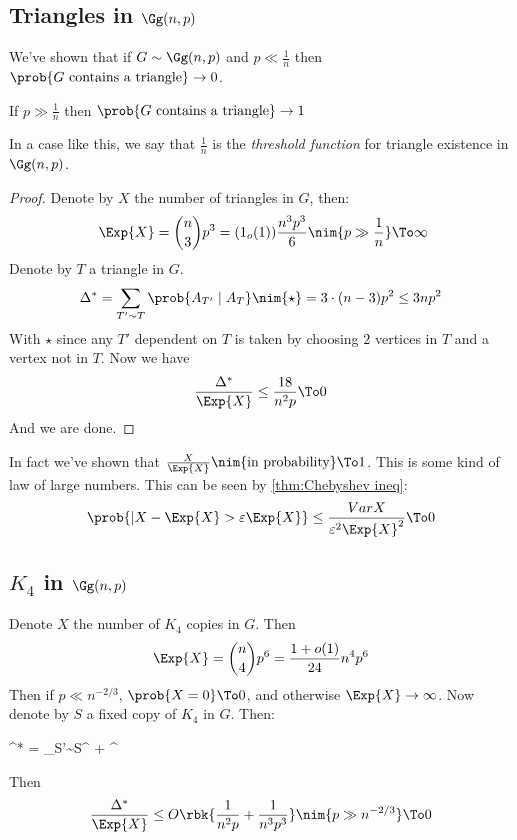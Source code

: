 \documentclass[a4paper, 11pt, oneside]{book}
\begin{document}
\subsection{Triangles in $\Gg(n,p)$}
We've shown that if $G\sim \Gg(n,p)$ and $p \ll \frac{1}{n}$ then $\prob{G\text{ contains a triangle}}\to 0$.
\begin{claim}
	If $p \gg \frac{1}{n}$ then $\prob{G\text{ contains a triangle}}\to 1$
\end{claim}
\begin{remark}
In a case like this, we say that $\frac{1}{n}$ is the \emph{threshold function} for triangle existence in $\Gg(n,p)$.
\end{remark}
\begin{proof}
	Denote by $X$ the number of triangles in $G$, then:
	\[
	\
	\Exp{X} = {n\choose 3}p^3 = (1_o(1))\frac{n^3p^3}{6}\nim{p\gg \frac{1}{n}}\To\infty
	\]
	Denote by $T$ a triangle in $G$.
	\[
	\Delta^* = \sum_{T'\sim T}\prob{A_{T'}\mid A_T} \nim{\star}= 3\cdot(n-3)p^2\le 3np^2
	\]
	With $\star$ since any $T'$ dependent on $T$ is taken by choosing $2$ vertices in $T$ and a vertex not in $T$. Now we have
	\[
	\frac{\Delta^*}{\Exp{X}} \le \frac{18}{n^2p}\To 0
	\]
	And we are done.
\end{proof}
\begin{remark}
In fact we've shown that $\frac{X}{\Exp{X}}\nim{\text{in probability}}\To 1$. This is some kind of law of large numbers. This can be seen by \autoref{thm:Chebyshev ineq}:
\[
\prob{|X-\Exp{X}> \varepsilon \Exp{X}}\le \frac{Var{X}}{\varepsilon^2\Exp{X}^2}\To 0
\]
\end{remark}

\subsection{$K_4$ in $\Gg(n,p)$}
Denote $X$ the number of $K_4$ copies in $G$. Then
\[
\Exp{X} = {n\choose 4}p^6 = \frac{1+o(1)}{24}n^4p^6
\]
Then if $p \ll n^{-2/3}$, $\prob{X = 0}\To 0$, and otherwise $\Exp{X}\to \infty$. Now denote by $S$ a fixed copy of $K_4$ in $G$. Then:
\begin{flalign*}
	\Delta^* = \sum_{S'\sim S}\le {}^ + ^
\end{flalign*}
Then
\[
\frac{\Delta^*}{\Exp{X}} \le O\rbk{\frac{1}{n^2p} + \frac{1}{n^3p^3}}\nim{p\gg n^{-2/3}}\To 0
\]
\end{document}
